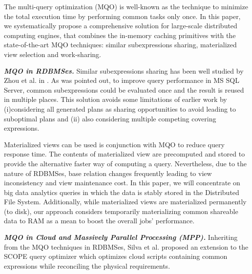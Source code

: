 The multi-query optimization (MQO) is well-known as the technique to minimize the total execution time by performing common tasks only once. In this paper, we systematically propose a comprehensive solution for large-scale distributed computing engines, that combines the in-memory caching primitives with the state-of-the-art MQO techniques: similar subexpressions sharing, materialized view selection and work-sharing.

\emph{\textbf{MQO in RDBMSes.}} Similar subexpressions sharing has been well studied by Zhou et al. in \cite{zhou2007efficient}. As was pointed out, to improve query performance in MS SQL Server, common subexpressions could be evaluated once and the result is reused in multiple places. This solution avoids some limitations of earlier work \cite{finkelstein1982common, roy2000efficient} by (i)considering all generated plans as sharing opportunities to avoid leading to suboptimal plans and (ii) also considering multiple competing covering expressions. 



Materialized views can be used is conjunction with MQO to reduce query response time. The contents of materialized view are precomputed and stored to provide the alternative faster way of computing a query. Nevertheless, due to the nature of RDBMSes, base relation changes frequently leading to view inconsistency and view maintenance cost. In this paper, we will concentrate on big data analytics queries in which the data is stably stored in the Distributed File System. Additionally, while materialized views are materialized permanently (to disk), our approach considers temporarily materializing common shareable data to RAM as a mean to boost the overall jobs' performance.

\emph{\textbf{MQO in Cloud and Massively Parallel Processing (MPP).}} Inheriting from the MQO techniques in RDBMSes, Silva et al. \cite{silva2012exploiting} proposed an extension to the SCOPE query optimizer which optimizes cloud scripts containing common expressions while reconciling the physical requirements.

